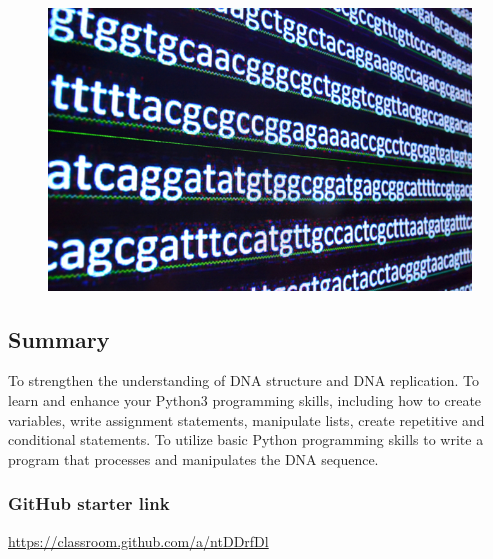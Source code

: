 


\long{}




\flushleft


\begin{figure}[ht!]
	\begin{center}
	 \includegraphics[scale=.3]{graphics/writtenDNA.jpg}
	\end{center}
\end{figure}


\subsection*{Summary}

To strengthen the understanding of DNA structure and DNA replication. To learn and enhance your Python3 programming skills, including how to create variables, write assignment statements, manipulate lists, create repetitive and conditional statements. To utilize basic Python programming skills to write a program that processes and manipulates the DNA sequence.



\subsubsection*{GitHub starter link}
\begin{center}
\color{red} \url{https://classroom.github.com/a/ntDDrfDl} \color{black}
\end{center}



